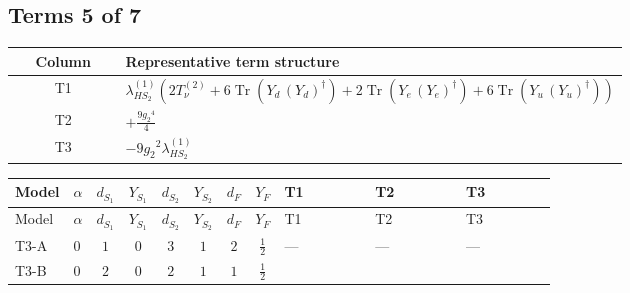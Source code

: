 \documentclass[8pt]{article}
\begin{document}
\begin{landscape}
\subsection*{Terms 5 of 7}
\begin{center}
\begin{tabular}{@{}c >{\raggedright\arraybackslash}p{0.82\linewidth}@{}}
\toprule
Column & Representative term structure \\
\midrule
T1 & \(\displaystyle {\lambda_{HS_2}^{(1)}} (2 T_{\nu}^{(2)}+6 \operatorname{Tr}\!\left({Y_d}\,\left({Y_d}\right)^{\dagger}\right)+2 \operatorname{Tr}\!\left({Y_e}\,\left({Y_e}\right)^{\dagger}\right)+6 \operatorname{Tr}\!\left({Y_u}\,\left({Y_u}\right)^{\dagger}\right))\) \\
\midrule
T2 & \(\displaystyle +\frac{9 {g_2}^4}{4}\) \\
\midrule
T3 & \(\displaystyle -9 {g_2}^2 {\lambda_{HS_2}^{(1)}}\) \\
\midrule
\bottomrule
\end{tabular}
\end{center}
\smallskip
\tiny
\begin{longtable}{@{}llcccccc >{\raggedright\arraybackslash}p{0.21\linewidth} >{\raggedright\arraybackslash}p{0.21\linewidth} >{\raggedright\arraybackslash}p{0.21\linewidth}@{}}
\toprule
Model & $\alpha$ & $d_{S_1}$ & $Y_{S_1}$ & $d_{S_2}$ & $Y_{S_2}$ & $d_F$ & $Y_F$ & T1 & T2 & T3 \\
\midrule
\endfirsthead
\toprule
Model & $\alpha$ & $d_{S_1}$ & $Y_{S_1}$ & $d_{S_2}$ & $Y_{S_2}$ & $d_F$ & $Y_F$ & T1 & T2 & T3 \\
\midrule
\endhead
T3-A & $0$ & $1$ & $0$ & $3$ & $1$ & $2$ & $\frac{1}{2}$ & --- & --- & --- \\
\midrule
T3-B & $0$ & $2$ & $0$ & $2$ & $1$ & $1$ & $\frac{1}{2}$ & \scriptsize\adjustbox{max width=\linewidth}{$\begin{gathered} {\lambda_{HS_2}^{(1)}} (2 T_{\nu}^{(2)}+6 \operatorname{Tr}\!\left({Y_d}\,\left({Y_d}\right)^{\dagger}\right)+2 \operatorname{Tr}\!\left({Y_e}\,\left({Y_e}\right)^{\dagger}\right)+6 \operatorname{Tr}\!\left({Y_u}\,\left({Y_u}\right)^{\dagger}\right))\end{gathered}$} & \scriptsize\adjustbox{max width=\linewidth}{$\begin{gathered} +\frac{9 {g_2}^4}{4}\end{gathered}$} & \scriptsize\adjustbox{max width=\linewidth}{$\begin{gathered} -9 {g_2}^2 {\lambda_{HS_2}^{(1)}}\end{gathered}$} \\

\end{longtable}
\end{landscape}
\end{document}
